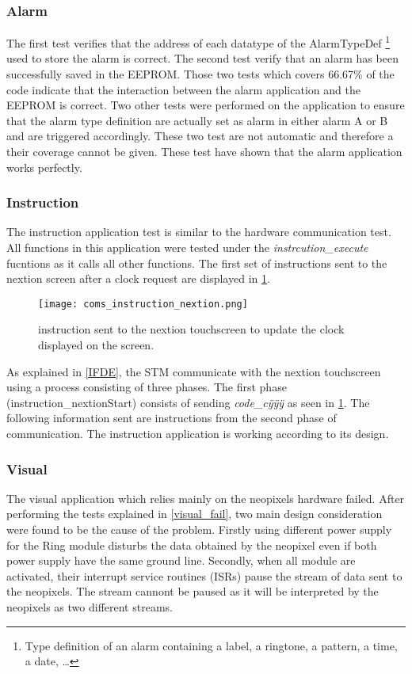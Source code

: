 \subsubsection{Alarm}
The first test verifies that the address of each datatype of the AlarmTypeDef \footnote{Type definition of an alarm containing a label, a ringtone, a pattern, a time, a date, \ldots} used to store the alarm is correct. The second test verify that an alarm has been successfully saved in the EEPROM. Those two tests which covers 66.67\% of the code indicate that the interaction between the alarm application and the EEPROM is correct. Two other tests were performed on the application to ensure that the alarm type definition are actually set as alarm in either alarm A or B and are triggered accordingly. These two test are not automatic and therefore a their coverage cannot be given. These test have shown that the alarm application works perfectly.
  
\subsubsection{Instruction}
The instruction application test is similar to the hardware communication test. All functions in this application were tested under the \textit{instrcution\_execute} fucntions as it calls all other functions. The first set of instructions sent to the nextion screen after a clock request are displayed in \cref{fig:coms_instruction_nextion}.
\begin{figure}[ht]
	\centering
	\texttt{[image: coms\_instruction\_nextion.png]}
	\caption{instruction sent to the nextion touchscreen to update the clock displayed on the screen.}
	\label{fig:coms_instruction_nextion}
\end{figure}
As explained in \ref{IFDE}, the STM communicate with the nextion touchscreen using a process consisting of three phases. The first phase (instruction\_nextionStart) consists of sending \textit{code\_c\"{y}\"{y}\"{y}} as seen in \cref{fig:coms_instruction_nextion}. The following information sent are instructions from the second phase of communication. The instruction application is working according to its design.

\subsubsection{Visual}
The visual application which relies mainly on the neopixels hardware failed. After performing the tests explained in \ref{visual_fail}, two main design consideration were found to be the cause of the problem. Firstly using different power supply for the Ring module disturbs the data obtained by the neopixel even if both power supply have the same ground line. Secondly, when all module are activated, their interrupt service routines (ISRs) pause the stream of data sent to the neopixels. The stream cannont be paused as it will be interpreted by the neopixels as two different streams. 
 
